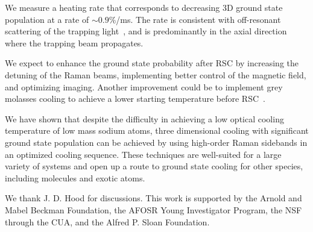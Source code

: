 \documentclass[aps,prl,twocolumn,groupedaddress]{revtex4-1}
\begin{document}
We measure a heating rate that corresponds to decreasing 3D ground state population
at a rate of $\sim0.9$\%/ms.
The rate is consistent with off-resonant scattering of the trapping light~\cite{Grimm2000},
and is predominantly in the axial direction where the trapping beam propagates.

We expect to enhance the ground state probability after RSC
by increasing the detuning of the Raman beams,
implementing better control of the magnetic field, and optimizing imaging.
Another improvement could be to implement grey molasses cooling to achieve
a lower starting temperature before RSC~\cite{Colzi2016}.

We have shown that despite the difficulty in achieving a low optical cooling temperature
of low mass sodium atoms,  three dimensional cooling
with significant ground state population can be achieved by using high-order Raman sidebands
in an optimized cooling sequence.
These techniques are well-suited for a large variety of systems
and open up a route to ground state cooling for other species,
including molecules and exotic atoms.

We thank J. D. Hood for discussions.
This work is supported by the Arnold and Mabel Beckman Foundation, the AFOSR Young Investigator Program, the NSF through the CUA,
and the Alfred P. Sloan Foundation.


\end{document}
